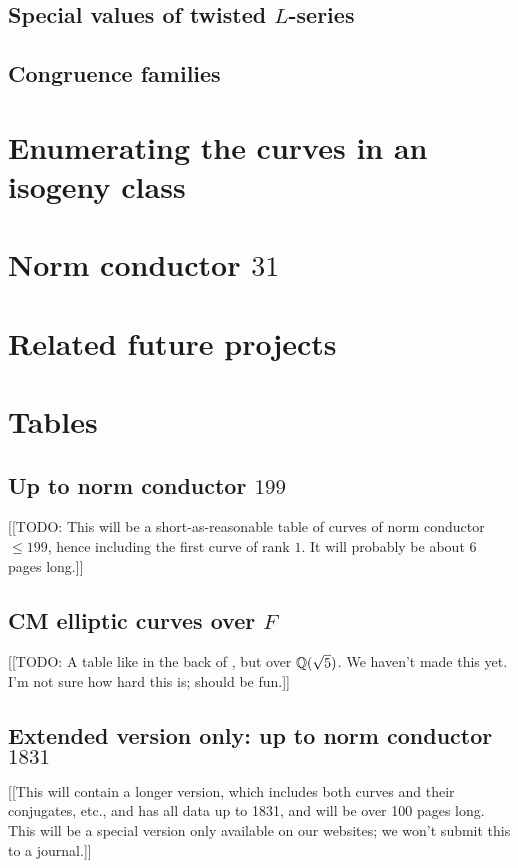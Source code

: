 \documentclass{amsart}
\begin{document}
\subsection{Special values of twisted $L$-series}

\subsection{Congruence families}

\section{Enumerating the curves in an isogeny class}

\section{Norm conductor $31$}\label{sec:31}

\section{Related future projects}\label{sec:future}

\section{Tables}\label{sec:tables}

\subsection{Up to norm conductor  $199$}\label{sec:to199}

[[TODO: This will be a short-as-reasonable table of curves of norm
conductor $\leq 199$, hence including the first curve of rank $1$.  It
will probably be about 6 pages long.]]

\subsection{CM elliptic curves over $F$}\label{sec:cm}

[[TODO: A table like in the back of \cite{silverman:aec2}, but over
$\mathbb{Q}(\sqrt{5})$.  We haven't made this yet.  I'm not sure how hard this
is; should be fun.]]

\subsection{Extended version only: up to norm conductor  $1831$}\label{sec:to1831}

[[This will contain a longer version, which includes both curves and
their conjugates, etc., and has all data up to 1831, and will be over
100 pages long.  This will be a special version only available on our
websites; we won't submit this to a journal.]]



 

\end{document}
